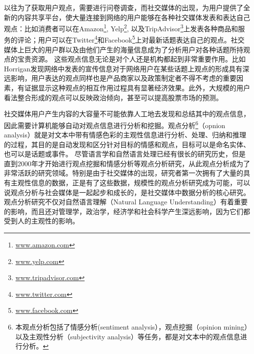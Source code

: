 以往为了获取用户观点，需要进行问卷调查，而社交媒体的出现，为用户提供了全新的内容共享平台，使大量连接到网络的用户能够在各种社交媒体发表和表达自己观点：比如消费者可以在Amazon\footnote{\url{www.amazon.com}}, Yelp\footnote{\url{www.yelp.com}}, 以及TripAdvisor\footnote{\url{www.tripadvisor.com}}上发表各种商品和服务的评论；用户可以在Twitter\footnote{\url{www.twitter.com}}和Facebook\footnote{\url{www.facebook.com}}上对最新话题表达自己的观点。社交媒体上巨大的用户群以及由他们产生的海量信息成为了分析用户对各种话题所持观点的宝贵资源。
这些观点信息无论是对个人还是机构都起到非常重要作用。比如Horrigan发现网络中发表的宣传信息对于网络用户在某些话题上观点的形成具有深远影响，用户表达的观点同样也是产品商家以及政策制定者不得不考虑的重要因素，有证据显示这种观点的相互作用过程具有显著经济效果。此外，大规模的用户看法整合形成的观点可以反映政治倾向，甚至可以提高股票市场的预测。

社交媒体用户产生内容的大容量不可能依靠人工地去发现和总结其中的观点信息，因此需要计算机能够自动对观点信息进行分析和挖掘。观点分析\footnote{本观点分析包括了情感分析(sentiment analysis），观点挖掘（opinion mining）以及主观性分析（subjectivity analysis）等任务，都是对文本中的观点信息进行分析。}（opnion analysis）就是对文本中带有情感色彩的主观性信息进行分析、处理、归纳和推理的过程，其目的是自动发现和区分针对目标的情感和观点，目标可以是命名实体、也可以是话题或事件。
尽管语言学和自然语言处理已经有很长的研究历史，但是直到2000年才开始进行观点挖掘和情感分析等观点分析研究，从此观点分析成为了非常活跃的研究领域。特别是由于社交媒体的出现，研究者第一次拥有了大量的具有主观性信息的数据，正是有了这些数据，规模性的观点分析研究成为可能，可以说观点分析与社会媒体是一起起步和成长的，是社交媒体中数据分析的核心研究。观点分析研究不仅对自然语言理解（Natural Language Understanding）有着重要的影响，而且还对管理学，政治学，经济学和社会科学产生深远影响，因为它们都受到人的主观性的影响。

%
%

